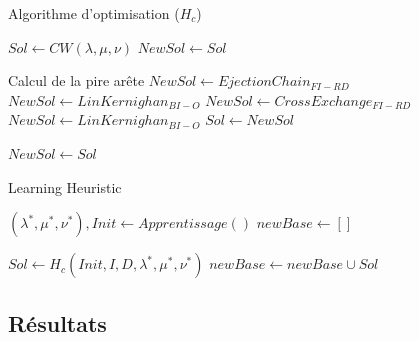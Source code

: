 \documentclass{beamer}
\begin{document}
\begin{frame}{Algorithme d'optimisation ($H_c$)}

\begin{algorithm}[H]
\DontPrintSemicolon %

$Sol \gets CW(\lambda,\mu,\nu)$\;
$NewSol \gets Sol$\;
 {
	Calcul de la pire arête\;
	$NewSol \gets EjectionChain_{FI-RD}$\;
	$NewSol \gets LinKernighan_{BI-O}$\;
	$NewSol \gets CrossExchange_{FI-RD}$\;
	$NewSol \gets LinKernighan_{BI-O}$\;
	 {
		$Sol \gets NewSol$\;
	}

	 {  
		$NewSol \gets Sol$\;
	}
}
\;

\end{algorithm}

\end{frame}

\begin{frame}{Learning Heuristic}
\begin{algorithm}[H]
\DontPrintSemicolon %
$(\lambda^*,\mu^*,\nu^*), Init \gets Apprentissage()$\;
$newBase \gets []$\;
 {
	 {
		
		 {
			$Sol \gets H_c(Init,I,D,\lambda^*,\mu^*,\nu^*)$\;
			$newBase \gets newBase \cup Sol$\;
			}	
		
	}
}
\;
\end{algorithm}
\end{frame}

\subsection{Résultats}
\end{document}

